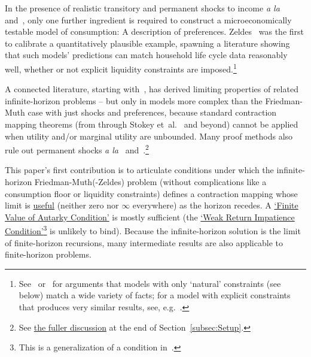 \documentclass[BufferStockTheory]{subfiles}
\begin{document}
In the presence of realistic transitory and permanent shocks to income \textit{a la}~\cite{friedmanATheory} and~\cite{muthOptimal}, only one further ingredient is required to construct a microeconomically testable model of consumption: A description of preferences.  Zeldes~\citeyearpar{zeldesStochastic} was the first to calibrate a quantitatively plausible example, spawning a literature showing that such models' predictions can match household life cycle data reasonably well, whether or not explicit liquidity constraints are imposed.\footnote{See~\cite{carrollBSLCPIH} or~\cite{gpLifeCycle} for arguments that models with only `natural' constraints (see below) match a wide variety of facts; for a model with explicit constraints that produces very similar results, see, e.g.~\cite{Cagetti}.}

A connected literature, starting with~\cite{bewleyPIH}, has derived limiting properties of related infinite-horizon problems -- but only in models more complex than the Friedman-Muth case with just shocks and preferences, because standard contraction mapping theorems (from \cite{bellmanDynamicProgramming} through Stokey et~al.~\citeyearpar{slpMethods} and beyond) cannot be applied when utility and/or marginal utility are unbounded. Many proof methods also rule out permanent shocks \textit{a la}~\cite{friedmanATheory} and~\cite{muthOptimal}.\footnote{See \hyperlink{DiffFromLit}{the fuller discussion} at the end of Section~\ref{subsec:Setup}.}

This paper's first contribution is to articulate conditions under which the infinite-horizon Friedman-Muth(-Zeldes) problem (without complications like a consumption floor or liquidity constraints) defines a contraction mapping whose limit is \hyperlink{useful}{useful} (neither zero nor $\infty$ everywhere) as the horizon recedes.  A \hyperlink{FVAC}{`Finite Value of Autarky Condition'} is mostly sufficient (the \hyperlink{WRIC}{`Weak Return Impatience Condition'}\footnote{This is a generalization of a condition in~\cite{mstIncFluct}.} is unlikely to bind).  Because the infinite-horizon solution is the limit of finite-horizon recursions, many intermediate results are also applicable to finite-horizon problems.
\end{document}
